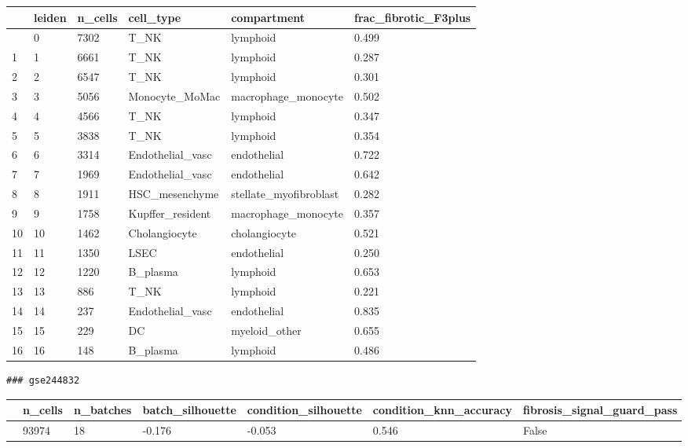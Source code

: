 \documentclass[
  letterpaper,
  DIV=11,
  numbers=noendperiod]{scrartcl}
\newcounter{none} %
\begin{document}
{\def\LTcaptype{none} %
\begin{longtable}[]{@{}llllll@{}}
\toprule\noalign{}
& leiden & n\_cells & cell\_type & compartment &
frac\_fibrotic\_F3plus \\
\midrule\noalign{}
\endhead
\bottomrule\noalign{}
\endlastfoot
0 & 0 & 7302 & T\_NK & lymphoid & 0.499 \\
1 & 1 & 6661 & T\_NK & lymphoid & 0.287 \\
2 & 2 & 6547 & T\_NK & lymphoid & 0.301 \\
3 & 3 & 5056 & Monocyte\_MoMac & macrophage\_monocyte & 0.502 \\
4 & 4 & 4566 & T\_NK & lymphoid & 0.347 \\
5 & 5 & 3838 & T\_NK & lymphoid & 0.354 \\
6 & 6 & 3314 & Endothelial\_vasc & endothelial & 0.722 \\
7 & 7 & 1969 & Endothelial\_vasc & endothelial & 0.642 \\
8 & 8 & 1911 & HSC\_mesenchyme & stellate\_myofibroblast & 0.282 \\
9 & 9 & 1758 & Kupffer\_resident & macrophage\_monocyte & 0.357 \\
10 & 10 & 1462 & Cholangiocyte & cholangiocyte & 0.521 \\
11 & 11 & 1350 & LSEC & endothelial & 0.250 \\
12 & 12 & 1220 & B\_plasma & lymphoid & 0.653 \\
13 & 13 & 886 & T\_NK & lymphoid & 0.221 \\
14 & 14 & 237 & Endothelial\_vasc & endothelial & 0.835 \\
15 & 15 & 229 & DC & myeloid\_other & 0.655 \\
16 & 16 & 148 & B\_plasma & lymphoid & 0.486 \\
\end{longtable}
}

\begin{verbatim}
### gse244832
\end{verbatim}

{\def\LTcaptype{none} %
\begin{longtable}[]{@{}lllllll@{}}
\toprule\noalign{}
& n\_cells & n\_batches & batch\_silhouette & condition\_silhouette &
condition\_knn\_accuracy & fibrosis\_signal\_guard\_pass \\
\midrule\noalign{}
\endhead
\bottomrule\noalign{}
\endlastfoot
0 & 93974 & 18 & -0.176 & -0.053 & 0.546 & False \\
\end{longtable}
}
\end{document}
